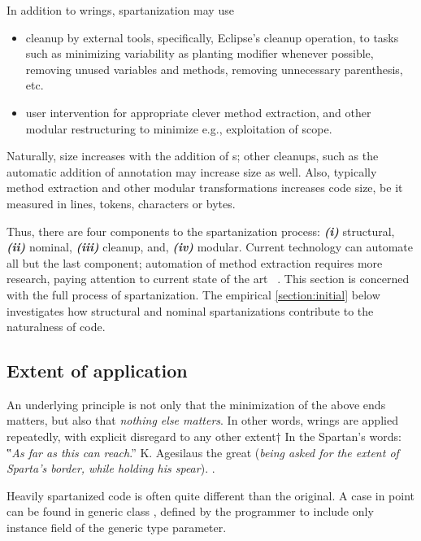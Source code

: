 In addition to wrings, spartanization may use
\begin{itemize}
    \item cleanup by external tools, specifically, Eclipse's cleanup operation,
      to tasks such as minimizing variability as planting  modifier
      whenever possible, removing unused variables and methods, removing
      unnecessary parenthesis, etc.
    \item user intervention for appropriate
        clever method extraction, and other modular restructuring to
        minimize e.g., exploitation of scope.
\end{itemize}
Naturally, size increases with the addition of s; other cleanups, such
as the automatic addition of  annotation may increase size as well.
Also, typically method extraction and other modular transformations increases
code size, be it measured in lines, tokens, characters or bytes.

Thus, there are four components to the spartanization process:
\emph{\textbf{(i)}} structural,
\emph{\textbf{(ii)}} nominal,
\emph{\textbf{(iii)}} cleanup, and,
\emph{\textbf{(iv)}} modular.
Current technology can automate all but the last component;
automation of method extraction requires more research,
paying attention to current state of the art \matteo~\cite{%
    we should have many citations
    somewhere can you please add some citations
}.
This section is concerned with the full process of spartanization.
The empirical \cref{section:initial} below investigates how structural and
nominal spartanizations contribute to the naturalness of code.

\subsection{Extent of application}
\label{section:extent}
An underlying principle is not only that the minimization of
the above ends matters, but also that \emph{nothing else matters}.
In other words, wrings are applied repeatedly, with explicit disregard
to any other extent†{%
  In the Spartan's words: ‟\textit{As far as this can reach}.” K. Agesilaus the
  great (\textsl{being asked for the extent of Sparta's border, while
  holding his spear}).
}.

Heavily spartanized code is often quite different than the original. A case in
point can be found in generic class , defined by the programmer to
include only instance field  of the generic type parameter.

